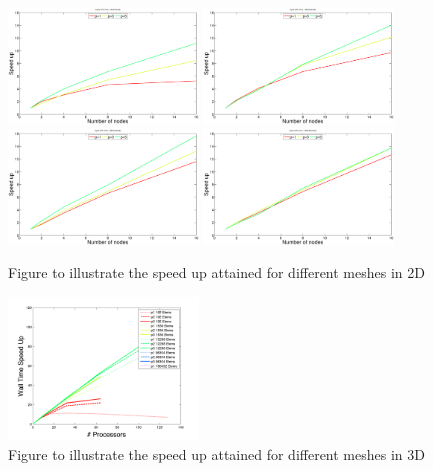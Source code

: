 \begin{figure}[htbp!]
 \centering
 \includegraphics[width=0.45\textwidth]{Figures/Chapters/Parallelisation/speedUp2D/50Elements}
 \includegraphics[width=0.45\textwidth]{Figures/Chapters/Parallelisation/speedUp2D/200Elements}
 \includegraphics[width=0.45\textwidth]{Figures/Chapters/Parallelisation/speedUp2D/800Elements}
 \includegraphics[width=0.45\textwidth]{Figures/Chapters/Parallelisation/speedUp2D/3200Elements}
 \caption{Figure to illustrate the speed up attained for different meshes in 2D}
 \label{stability-faces}
\end{figure}

\begin{figure}[htbp!]
 \centering
 \includegraphics[width=0.45\textwidth]{Figures/Chapters/Parallelisation/speedUp3D/speedUp}
 \caption{Figure to illustrate the speed up attained for different meshes in 3D}
 \label{stability-faces}
\end{figure}
